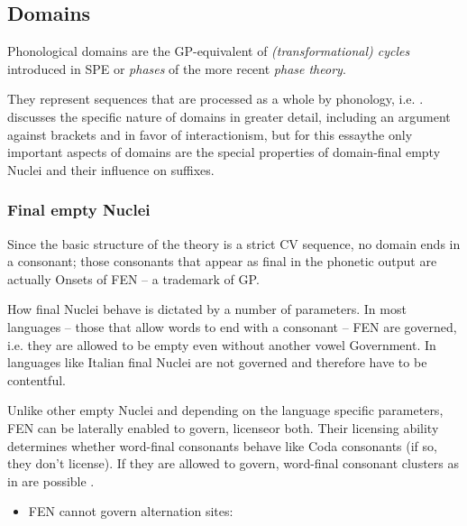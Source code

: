 \subsection{Domains}

Phonological domains are the \gls{GP}-equivalent of
\emph{(transformational) cycles} introduced in SPE \parencite{chomsky1968}
or \emph{phases} of the more recent \emph{phase theory}.

They represent sequences that are processed as a whole by phonology, i.e.
.
\Cite{scheer2012} discusses the specific nature of domains in greater
detail, including an argument against brackets and in favor of
interactionism, but for this essay\co the only important aspects of
domains are the special properties of domain-final empty Nuclei and
their influence on suffixes.


\subsubsection{Final empty Nuclei}
Since the basic structure of the theory is a strict CV sequence,
no domain ends in a consonant; those consonants that appear as final
in the phonetic output are actually Onsets of \gls{FEN}
-- a trademark of \gls{GP}.

How final Nuclei behave is dictated by a number of parameters.
In most languages -- those that allow words to end with a consonant --
\gls{FEN} are governed, i.e. they are allowed to be empty even without
another vowel  Government.
In languages like Italian final Nuclei are not governed and therefore
have to be contentful.

Unlike other empty Nuclei and depending on the language specific parameters,
\gls{FEN} can be laterally enabled to govern, license\co or both.
Their licensing ability determines whether word-final consonants behave
like Coda consonants (if so, they don't license).
If they are allowed to govern, word-final consonant clusters as in 
are possible \cite[appendix~1]{scheer2004}.

\begin{itemize}\color{red}
  \item FEN cannot govern alternation sites:\\
\end{itemize}


